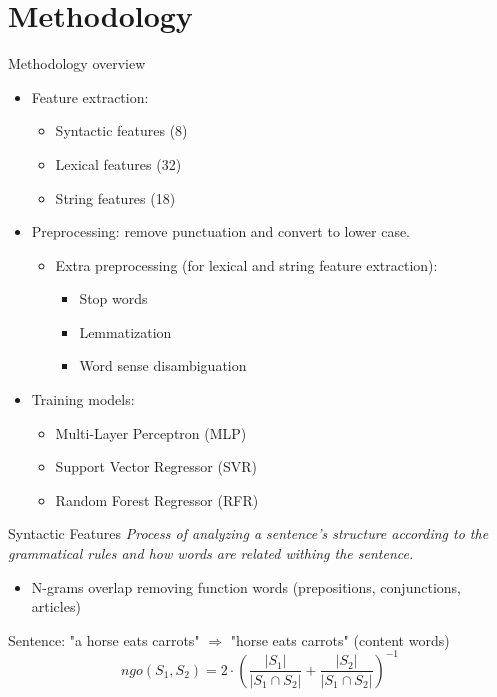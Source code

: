 \section{Methodology}
\frame{\tableofcontents[currentsection]}

\begin{frame}{Methodology overview}
    \begin{itemize}
        \item Feature extraction:
        \begin{itemize}
            \item Syntactic features (8)
            \item Lexical features (32)
            \item String features (18)
        \end{itemize}
        \vspace{0.4cm}
        \item Preprocessing: remove punctuation and convert to lower case.
        \begin{itemize}
            \item Extra preprocessing (for lexical and string feature extraction):
            \begin{itemize}
                \item Stop words
                \item Lemmatization
                \item Word sense disambiguation
            \end{itemize}
        \end{itemize}
        \vspace{0.4cm}
        \item Training models:
        \begin{itemize}
            \item Multi-Layer Perceptron (MLP)
            \item Support Vector Regressor (SVR)
            \item Random Forest Regressor (RFR)
        \end{itemize} 
    \end{itemize}
\end{frame}

\begin{frame}{Syntactic Features}
    \textit{Process of analyzing a sentence's structure according to the grammatical rules and how words are related withing 
    the sentence.}
    \vspace{1cm}
    \begin{itemize}
        \item N-grams overlap removing function words (prepositions, conjunctions, articles)
    \end{itemize}
    \vspace{1cm}
    Sentence: "a horse eats carrots" $\Rightarrow$ "horse eats carrots" (content words)
         \[ ngo(S_1, S_2) = 2 \cdot \left( \frac{|S_1|}{|S_1 \cap S_2|} + \frac{|S_2|}{|S_1 \cap S_2|} \right)^{-1} \]
\end{frame}

